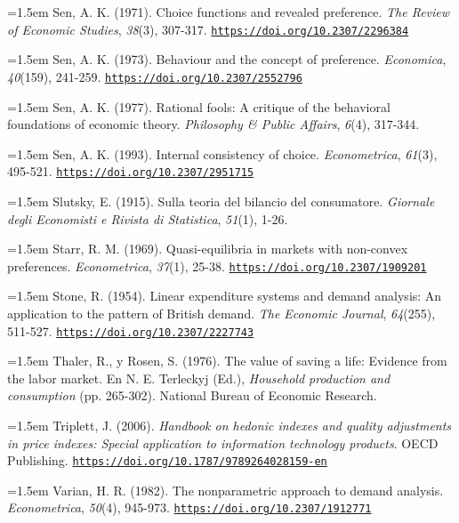 \documentclass[10pt,a4paper]{article}
\begin{document}
\noindent\hangindent=1.5em Sen, A. K. (1971). Choice functions and revealed preference. \textit{The Review of Economic Studies}, \textit{38}(3), 307-317. \href{https://doi.org/10.2307/2296384}{\nolinkurl{https://doi.org/10.2307/2296384}}

\noindent\hangindent=1.5em Sen, A. K. (1973). Behaviour and the concept of preference. \textit{Economica}, \textit{40}(159), 241-259. \href{https://doi.org/10.2307/2552796}{\nolinkurl{https://doi.org/10.2307/2552796}}

\noindent\hangindent=1.5em Sen, A. K. (1977). Rational fools: A critique of the behavioral foundations of economic theory. \textit{Philosophy \& Public Affairs}, \textit{6}(4), 317-344.

\noindent\hangindent=1.5em Sen, A. K. (1993). Internal consistency of choice. \textit{Econometrica}, \textit{61}(3), 495-521. \href{https://doi.org/10.2307/2951715}{\nolinkurl{https://doi.org/10.2307/2951715}}

\noindent\hangindent=1.5em Slutsky, E. (1915). Sulla teoria del bilancio del consumatore. \textit{Giornale degli Economisti e Rivista di Statistica}, \textit{51}(1), 1-26.

\noindent\hangindent=1.5em Starr, R. M. (1969). Quasi-equilibria in markets with non-convex preferences. \textit{Econometrica}, \textit{37}(1), 25-38. \href{https://doi.org/10.2307/1909201}{\nolinkurl{https://doi.org/10.2307/1909201}}

\noindent\hangindent=1.5em Stone, R. (1954). Linear expenditure systems and demand analysis: An application to the pattern of British demand. \textit{The Economic Journal}, \textit{64}(255), 511-527. \href{https://doi.org/10.2307/2227743}{\nolinkurl{https://doi.org/10.2307/2227743}}

\noindent\hangindent=1.5em Thaler, R., y Rosen, S. (1976). The value of saving a life: Evidence from the labor market. En N. E. Terleckyj (Ed.), \textit{Household production and consumption} (pp. 265-302). National Bureau of Economic Research.

\noindent\hangindent=1.5em Triplett, J. (2006). \textit{Handbook on hedonic indexes and quality adjustments in price indexes: Special application to information technology products}. OECD Publishing. \href{https://doi.org/10.1787/9789264028159-en}{\nolinkurl{https://doi.org/10.1787/9789264028159-en}}

\noindent\hangindent=1.5em Varian, H. R. (1982). The nonparametric approach to demand analysis. \textit{Econometrica}, \textit{50}(4), 945-973. \href{https://doi.org/10.2307/1912771}{\nolinkurl{https://doi.org/10.2307/1912771}}
\end{document}
